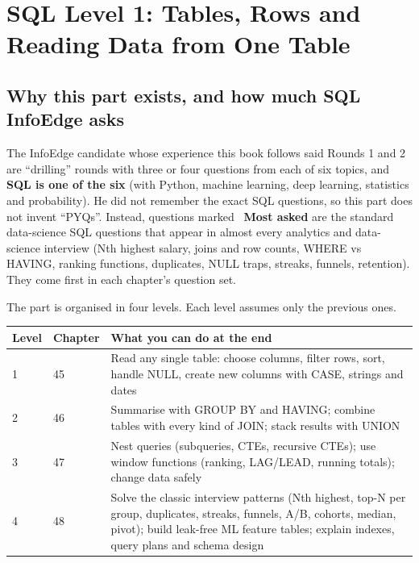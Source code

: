 \chapter{SQL Level 1: Tables, Rows and Reading Data from One Table}

\section*{Why this part exists, and how much SQL InfoEdge asks}
The InfoEdge candidate whose experience this book follows said Rounds 1 and 2 are ``drilling'' rounds with three or four questions from each of six
topics, and \textbf{SQL is one of the six} (with Python, machine learning, deep learning, statistics and probability). He did not remember the exact SQL
questions, so this part does not invent ``PYQs''. Instead, questions marked \textcolor{exframe}{\faCheckCircle\ \textbf{Most asked}} are the standard
data-science SQL questions that appear in almost every analytics and data-science interview (Nth highest salary, joins and row counts, WHERE vs HAVING,
ranking functions, duplicates, NULL traps, streaks, funnels, retention). They come first in each chapter's question set.

The part is organised in four levels. Each level assumes only the previous ones.
\begin{center}\small
\begin{tabularx}{\linewidth}{l l X}
\toprule
Level & Chapter & What you can do at the end\\
\midrule
1 & 45 & Read any single table: choose columns, filter rows, sort, handle NULL, create new columns with CASE, strings and dates\\
2 & 46 & Summarise with GROUP BY and HAVING; combine tables with every kind of JOIN; stack results with UNION\\
3 & 47 & Nest queries (subqueries, CTEs, recursive CTEs); use window functions (ranking, LAG/LEAD, running totals); change data safely\\
4 & 48 & Solve the classic interview patterns (Nth highest, top-N per group, duplicates, streaks, funnels, A/B, cohorts, median, pivot);
build leak-free ML feature tables; explain indexes, query plans and schema design\\
\bottomrule
\end{tabularx}
\end{center}

